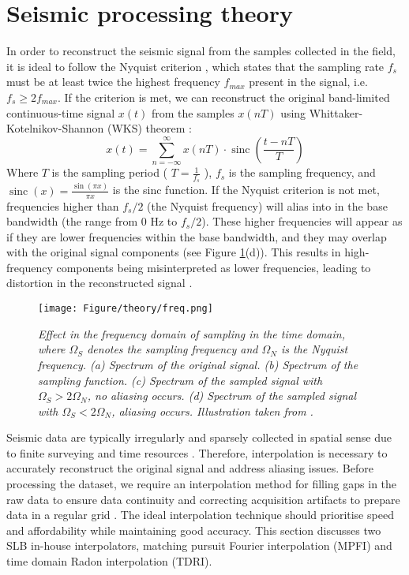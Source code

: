 \section{Seismic processing theory}
In order to reconstruct the seismic signal from the samples collected in the field, it is ideal to follow the Nyquist criterion \cite{shannon1949communication}, which states that the sampling rate $f_s$ must be at least twice the highest frequency $f_{max}$ present in the signal, i.e. $f_s \geq 2f_{max}$. If the criterion is met, we can reconstruct the original band-limited continuous-time signal $x(t)$ from the samples $x(nT)$ using Whittaker-Kotelnikov-Shannon (WKS) theorem  \cite{shannon1949communication}:
\begin{equation}
	x(t)=\sum_{n=-\infty}^{\infty} x(n T) \cdot \operatorname{sinc}\left(\frac{t-n T}{T}\right)
\end{equation}
\noindent Where $T$ is the sampling period ( $T=\frac{1}{f_s}$ ), $f_s$ is the sampling frequency, and  $\operatorname{sinc}(x)=\frac{\sin (\pi x)}{\pi x}$ is the sinc function. If the Nyquist criterion is not met, frequencies higher than $f_s/2$ (the Nyquist frequency) will alias into in the base bandwidth (the range from 0 Hz to $f_s/2$). These higher frequencies will appear as if they are lower frequencies within the base bandwidth, and they may overlap with the original signal components (see Figure \ref{fig:freq}(d)). This results in high-frequency components being misinterpreted as lower frequencies, leading to distortion in the reconstructed signal \cite{oppenheim1999discrete}. 
\\
\begin{figure}[h]
	\centering
	\texttt{[image: Figure/theory/freq.png]} 
	\caption{\textit{Effect in the frequency domain of sampling in the time domain, where $\Omega_S$ denotes the sampling frequency and $\Omega_N$ is the Nyquist frequency. (a) Spectrum of the original signal. (b) Spectrum of the sampling function. (c) Spectrum of the sampled signal with $\Omega_S>2 \Omega_N$, no aliasing occurs. (d) Spectrum of the sampled signal with $\Omega_S<2 \Omega_N$, aliasing occurs. Illustration taken from .}}
	\label{fig:freq}
\end{figure}

\noindent Seismic data are typically irregularly and sparsely collected in spatial sense due to finite surveying and time resources \cite{schonewille2013matching}. Therefore, interpolation is necessary to accurately reconstruct the original signal and address aliasing issues. Before processing the dataset, we require an interpolation method for filling gaps in the raw data to ensure data continuity and correcting acquisition artifacts to prepare data in a regular grid \cite{claerbout1976fundamentals}. The ideal interpolation technique should prioritise speed and affordability while maintaining good accuracy. This section discusses two SLB in-house interpolators, matching pursuit Fourier interpolation (MPFI) and time domain Radon interpolation (TDRI).  


